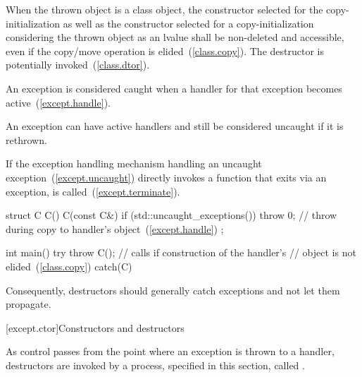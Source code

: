 \pnum
{}%
%
When the thrown object is a class object, the constructor selected for
the copy-initialization as well as the constructor selected for
a copy-initialization considering the thrown object as an lvalue
shall be non-deleted and accessible, even if the copy/move operation is
elided~(\ref{class.copy}).
The destructor is potentially invoked~(\ref{class.dtor}).

\pnum
{}%
%
An exception is considered caught when a handler for that exception
becomes active~(\ref{except.handle}).
\begin{note}
An exception can have active handlers and still be considered uncaught if
it is rethrown.
\end{note}

\pnum
{}%
%
If the exception handling mechanism
handling an uncaught exception~(\ref{except.uncaught})
directly invokes a function that exits via an
exception,  is called~(\ref{except.terminate}).
\begin{example}
\begin{codeblock}
struct C {
  C() { }
  C(const C&) {
    if (std::uncaught_exceptions()) {
      throw 0;      // throw during copy to handler's  object~(\ref{except.handle})
    }
  }
};

int main() {
  try {
    throw C();      // calls  if construction of the handler's
                    //  object is not elided~(\ref{class.copy})
  } catch(C) { }
}
\end{codeblock}
\end{example}
\begin{note}
Consequently, destructors should generally catch exceptions and not let them propagate.
\end{note}


[except.ctor]{Constructors and destructors}%
%
%

\pnum
{}%
As control passes from the point where an exception is thrown
to a handler,
destructors are invoked by a process, specified in this section, called
.

